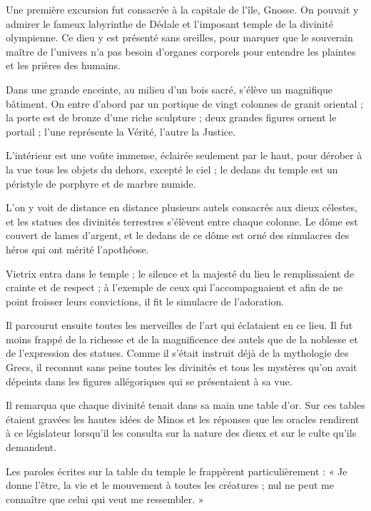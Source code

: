 \documentclass[a4paper, 11pt, oneside, polutonikogreek, french]{article}
\begin{document}
\bigskip
\centerline{\EightStarTaper}
\centerline{\EightStarTaper\EightStarTaper}
\bigskip

Une première excursion fut consacrée à la capitale de l'île, Gnosse. On pouvait y admirer le fameux labyrinthe de Dédale et l'imposant temple de la divinité olympienne. Ce dieu y est présenté sans oreilles, pour marquer que le souverain maître de l'univers n'a pas besoin d'organes corporels pour entendre les plaintes et les prières des humains.

Dans une grande enceinte, au milieu d'un bois sacré, s'élève un magnifique bâtiment. On entre d'abord par un portique de vingt colonnes de granit oriental ; la porte est de bronze d'une riche sculpture ; deux grandes figures ornent le portail ; l'une représente la Vérité, l'autre la Justice.

L'intérieur est une voûte immense, éclairée seulement par le haut, pour dérober à la vue tous les objets du dehors, excepté le ciel ; le dedans du temple est un péristyle de porphyre et de marbre numide.

L'on y voit de distance en distance plusieurs autels consacrés aux dieux célestes, et les statues des divinités terrestres s'élèvent entre chaque colonne. Le dôme est couvert de lames d'argent, et le dedans de ce dôme est orné des simulacres des héros qui ont mérité l'apothéose.

Vietrix entra dans le temple ; le silence et la majesté du lieu le remplissaient de crainte et de respect ; à l'exemple de ceux qui l'accompagnaient et afin de ne point froisser leurs convictions, il fit le simulacre de l'adoration.

Il parcourut ensuite toutes les merveilles de l'art qui éclataient en ce lieu. Il fut moins frappé de la richesse et de la magnificence des autels que de la noblesse et de l'expression des statues. Comme il s'était instruit déjà de la mythologie des Grecs, il reconnut sans peine toutes les divinités et tous les mystères qu'on avait dépeints dans les figures allégoriques qui se présentaient à sa vue.

Il remarqua que chaque divinité tenait dans sa main une table d'or. Sur ces tables étaient gravées les hautes idées de Minos et les réponses que les oracles rendirent à ce législateur lorsqu'il les consulta sur la nature des dieux et sur le culte qu'ils demandent.

Les paroles écrites sur la table du temple le frappèrent particulièrement : « Je donne l'être, la vie et le mouvement à toutes les créatures ; nul ne peut me connaître que celui qui veut me ressembler. »
\end{document}
